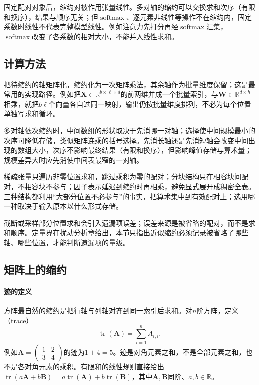 固定配对对象后，缩约对被作用张量线性。多对轴的缩约可以交换求和次序（有限和换序），结果与顺序无关；但$\operatorname{softmax}$、逐元素非线性等操作不在缩约内，固定系数时线性不代表完整模型线性。例如注意力先打分再经$\operatorname{softmax}$汇集，$\operatorname{softmax}$改变了各系数的相对大小，不能并入线性求和。

\subsection{计算方法}

把待缩约的轴矩阵化，缩约化为一次矩阵乘法，其余轴作为批量维度保留；这是最常用的实现路径。例如把$\bm X\in\mathbb R^{b\times\ell\times d}$的前两维并成一个批量索引，与$\bm W\in\mathbb R^{d\times h}$相乘，就把$b\ell$个向量各自过同一映射，输出仍按批量维度排列，不必为每个位置单独写求和循环。

多对轴依次缩约时，中间数组的形状取决于先消哪一对轴；选择使中间规模最小的次序可降低存储，类似矩阵连乘的括号选择。先消长轴还是先消短轴会改变中间出现的数组大小，次序不影响最终结果（有限和换序），但影响峰值存储与算术量；规模差异大时应先消使中间表最窄的一对轴。

稀疏张量只遍历非零位置求和，跳过乘积为零的配对；分块结构只在相容块间配对，不相容块不参与；因子表示延迟到缩约时再相乘，避免显式展开成稠密全表。三种结构都利用“大部分位置不必参与”的事实，把算术集中到有效配对上；选用哪一种取决于输入原本以什么形式存储。

截断或采样部分位置求和会引入遗漏项误差；误差来源是被省略的配对，而不是求和顺序。定量界在扰动分析章给出，本节只指出近似缩约必须记录被省略了哪些轴、哪些位置，才能判断遗漏项的量级。

\subsection{矩阵上的缩约}
\label{sec:ls-matrix-contractions}
\label{sec:prelim-matrix-trace}

\paragraph{迹的定义}

方阵最自然的缩约是把行轴与列轴对齐到同一索引后求和。对$n$阶方阵，定义（trace）
\[
 \operatorname{tr}(\bm A)=\sum_{i=1}^n A_{i,i}.
\]
例如$\bm A=\begin{pmatrix}1&2\\3&4\end{pmatrix}$的迹为$1+4=5$。迹是对角元素之和，不是全部元素之和，也不是各对角元素的乘积。有限和的线性规则直接给出$\operatorname{tr}(a\bm A+b\bm B)=a\operatorname{tr}(\bm A)+b\operatorname{tr}(\bm B)$，其中$\bm A,\bm B$同阶、$a,b\in\mathbb R$。

